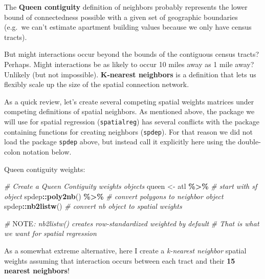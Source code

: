 \documentclass[
]{book}
\newenvironment{Shaded}{\begin{snugshade}}{\end{snugshade}}
\newcommand{\AlertTok}[1]{\textcolor[rgb]{0.94,0.16,0.16}{#1}}
\newcommand{\CommentTok}[1]{\textcolor[rgb]{0.56,0.35,0.01}{\textit{#1}}}
\newcommand{\FunctionTok}[1]{\textcolor[rgb]{0.13,0.29,0.53}{\textbf{#1}}}
\newcommand{\NormalTok}[1]{#1}
\newcommand{\OtherTok}[1]{\textcolor[rgb]{0.56,0.35,0.01}{#1}}
\newcommand{\SpecialCharTok}[1]{\textcolor[rgb]{0.81,0.36,0.00}{\textbf{#1}}}
\begin{document}
The \textbf{Queen contiguity} definition of neighbors probably represents the lower bound of connectedness possible with a given set of geographic boundaries (e.g.~we can't estimate apartment building values because we only have census tracts).

But might interactions occur beyond the bounds of the contiguous census tracts? Perhaps. Might interactions be as likely to occur 10 miles away as 1 mile away? Unlikely (but not impossible). \textbf{K-nearest neighbors} is a definition that lets us flexibly scale up the size of the spatial connection network.

As a quick review, let's create several competing spatial weights matrices under competing definitions of spatial neighbors. As mentioned above, the package we will use for spatial regression (\texttt{spatialreg}) has several conflicts with the package containing functions for creating neighbors (\texttt{spdep}). For that reason we did not load the package \texttt{spdep} above, but instead call it explicitly here using the double-colon notation below.

Queen contiguity weights:

\begin{Shaded}
\begin{Highlighting}[]
\CommentTok{\# Create a Queen Contiguity weights objects}
\NormalTok{queen }\OtherTok{\textless{}{-}}\NormalTok{ atl }\SpecialCharTok{\%\textgreater{}\%} \CommentTok{\# start with sf object}
\NormalTok{  spdep}\SpecialCharTok{::}\FunctionTok{poly2nb}\NormalTok{() }\SpecialCharTok{\%\textgreater{}\%}      \CommentTok{\# convert polygons to neighbor object}
\NormalTok{  spdep}\SpecialCharTok{::}\FunctionTok{nb2listw}\NormalTok{()         }\CommentTok{\# convert nb object to spatial weights}

\CommentTok{\# }\AlertTok{NOTE}\CommentTok{: nb2listw() creates row{-}standardized weighted by default}
\CommentTok{\# That is what we want for spatial regression}
\end{Highlighting}
\end{Shaded}

As a somewhat extreme alternative, here I create a \emph{k-nearest neighbor} spatial weights assuming that interaction occurs between each tract and their \textbf{15 nearest neighbors}!
\end{document}
